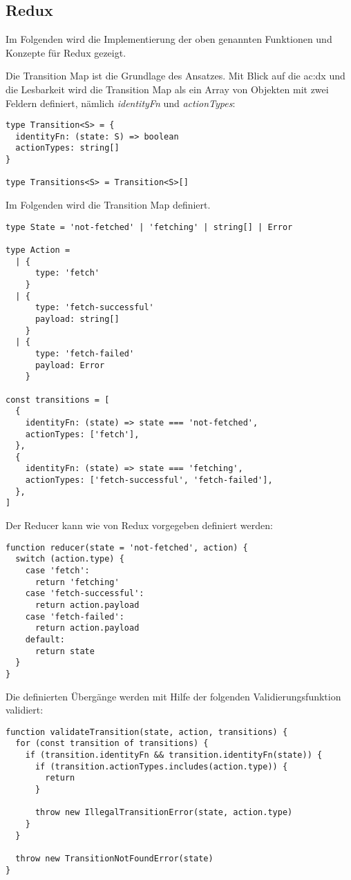 \subsection{Redux}

Im Folgenden wird die Implementierung der oben genannten Funktionen und Konzepte für Redux gezeigt.

Die Transition Map ist die Grundlage des Ansatzes. Mit Blick auf die \acrlong{ac:dx} und die Lesbarkeit wird die Transition Map als ein Array von Objekten mit zwei Feldern definiert, nämlich \textit{identityFn} und \textit{actionTypes}:

\begin{lstlisting}
type Transition<S> = {
  identityFn: (state: S) => boolean
  actionTypes: string[]
}
  
type Transitions<S> = Transition<S>[]
\end{lstlisting}

Im Folgenden wird die Transition Map definiert.

\begin{lstlisting}
type State = 'not-fetched' | 'fetching' | string[] | Error

type Action =
  | {
      type: 'fetch'
    }
  | {
      type: 'fetch-successful'
      payload: string[]
    }
  | {
      type: 'fetch-failed'
      payload: Error
    }
  
const transitions = [
  {
    identityFn: (state) => state === 'not-fetched',
    actionTypes: ['fetch'],
  },
  {
    identityFn: (state) => state === 'fetching',
    actionTypes: ['fetch-successful', 'fetch-failed'],
  },
]
\end{lstlisting}

Der Reducer kann wie von Redux vorgegeben definiert werden:

\begin{lstlisting}
function reducer(state = 'not-fetched', action) {
  switch (action.type) {
    case 'fetch':
      return 'fetching'
    case 'fetch-successful':
      return action.payload
    case 'fetch-failed':
      return action.payload
    default:
      return state
  }
}
\end{lstlisting}

Die definierten Übergänge werden mit Hilfe der folgenden Validierungsfunktion validiert:

\begin{lstlisting}
function validateTransition(state, action, transitions) {
  for (const transition of transitions) {
    if (transition.identityFn && transition.identityFn(state)) {
      if (transition.actionTypes.includes(action.type)) {
        return
      }
  
      throw new IllegalTransitionError(state, action.type)
    }
  }
  
  throw new TransitionNotFoundError(state)
}
\end{lstlisting}

